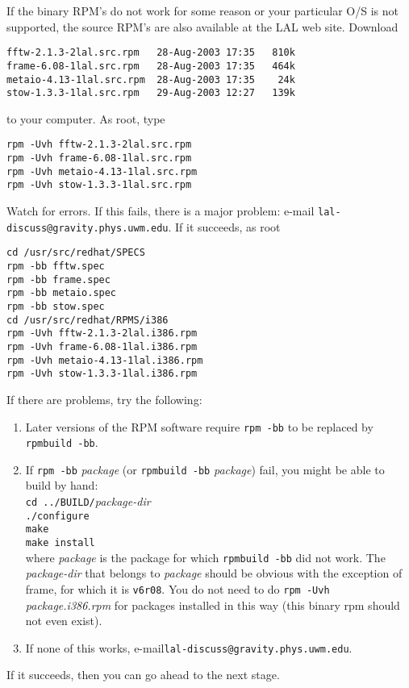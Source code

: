 If the binary RPM's do not work for some reason or your particular O/S
is not supported,   the source RPM's are also available at the LAL web
site.   Download
\begin{verbatim}
fftw-2.1.3-2lal.src.rpm   28-Aug-2003 17:35   810k  
frame-6.08-1lal.src.rpm   28-Aug-2003 17:35   464k  
metaio-4.13-1lal.src.rpm  28-Aug-2003 17:35    24k  
stow-1.3.3-1lal.src.rpm   29-Aug-2003 12:27   139k 
\end{verbatim}
to your computer.  As root,   type
\begin{verbatim}
rpm -Uvh fftw-2.1.3-2lal.src.rpm
rpm -Uvh frame-6.08-1lal.src.rpm
rpm -Uvh metaio-4.13-1lal.src.rpm
rpm -Uvh stow-1.3.3-1lal.src.rpm
\end{verbatim}
Watch for errors.  If this fails,  there is a major problem:  e-mail
\verb+lal-discuss@gravity.phys.uwm.edu+.    If it succeeds,  as root
\begin{verbatim}
cd /usr/src/redhat/SPECS
rpm -bb fftw.spec
rpm -bb frame.spec
rpm -bb metaio.spec
rpm -bb stow.spec
cd /usr/src/redhat/RPMS/i386
rpm -Uvh fftw-2.1.3-2lal.i386.rpm
rpm -Uvh frame-6.08-1lal.i386.rpm
rpm -Uvh metaio-4.13-1lal.i386.rpm
rpm -Uvh stow-1.3.3-1lal.i386.rpm
\end{verbatim}
If there are problems, try the following:
\begin{enumerate}
   \item Later versions of the RPM software require \verb+rpm -bb+ to be 
      replaced by \verb+rpmbuild -bb+. 
   \item If \verb+rpm -bb+ \textit{package} (or \verb+rpmbuild -bb+
      \textit{package}) fail, you might be able to build by hand:\\
      \verb+cd ../BUILD/+\textit{package-dir}\\
      \verb+./configure+\\
      \verb+make+\\
      \verb+make install+\\
      where \textit{package} is the package for which \verb+rpmbuild -bb+ 
      did not work. The \textit{package-dir} that belongs to 
      \textit{package} should be obvious with the exception of frame, for
      which it is \verb+v6r08+. You do not need to do \verb+rpm -Uvh+ 
      \textit{ package.i386.rpm} for packages installed in this way (this
      binary rpm should not even exist).
   \item If none of this works, e-mail\verb+lal-discuss@gravity.phys.uwm.edu+.   
\end{enumerate}
If it succeeds,  then you can go ahead to the next stage.   

